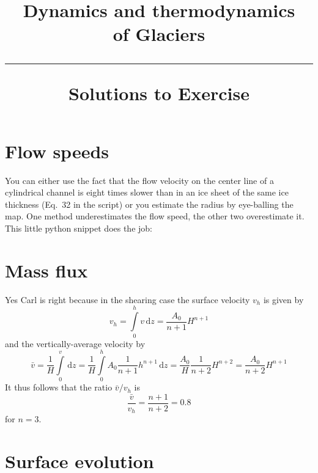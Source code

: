 \documentclass[DIV15,11pt,parskip=half]{scrartcl}
\begin{document}
\vspace{-5em}

\title{Dynamics and thermodynamics \\ of Glaciers \\[.2em]
\rule[1em]{\textwidth}{2pt}
\LARGE{\sf Solutions to Exercise}
}
\date{}

\maketitle


\vspace{-5em}

\section{Flow speeds}

You can either use the fact that the flow velocity on the center line of a cylindrical channel is eight times slower than in an ice sheet of the same ice thickness (Eq.~32 in the script) or you estimate the radius by eye-balling the map. One method underestimates the flow speed, the other two overestimate it. This little python snippet does the job:
\vspace{1em}

 \small{

}
\section{Mass flux}

Yes Carl is right because in the shearing case the surface velocity $v_h$ is given by
\begin{equation*}
 v_h = \int \limits_0^h v\,\mathrm{d}z  = \frac{A_0}{n+1}H^{n+1}
\end{equation*}
and the vertically-average velocity by
\begin{equation*}
\bar v = \frac{1}{H}\int \limits_0^ v\,\mathrm{d}z = \frac{1}{H}\int \limits_0^h A_0\frac{1}{n+1}h^{n+1}\,\mathrm{d}z = \frac{A_0}{H}\frac{1}{n+2}H^{n+2} = \frac{A_0}{n+2}H^{n+1}
\end{equation*} It thus follows that the ratio $\bar v / v_h$ is
\begin{equation*}
\frac{\bar v}{v_h} = \frac{n+1}{n+2} = 0.8
\end{equation*} for $n=3$.

\section{Surface evolution}
\end{document}
